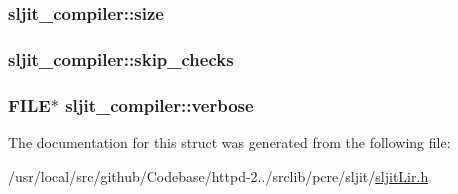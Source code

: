 \subsubsection[{\texorpdfstring{size}{size}}]{ sljit\+\_\+compiler\+::size}\hypertarget{structsljit__compiler_a39302de2338f12c65ad971f7c904c006}{}\label{structsljit__compiler_a39302de2338f12c65ad971f7c904c006}
\subsubsection[{\texorpdfstring{skip\+\_\+checks}{skip_checks}}]{ sljit\+\_\+compiler\+::skip\+\_\+checks}\hypertarget{structsljit__compiler_a3ffe514715475d66cb15f137c254ffc1}{}\label{structsljit__compiler_a3ffe514715475d66cb15f137c254ffc1}
\subsubsection[{\texorpdfstring{verbose}{verbose}}]{\setlength{\rightskip}{0pt plus 5cm}F\+I\+LE$\ast$ sljit\+\_\+compiler\+::verbose}\hypertarget{structsljit__compiler_aae189aee4170ce1cbb04b248832037d2}{}\label{structsljit__compiler_aae189aee4170ce1cbb04b248832037d2}


The documentation for this struct was generated from the following file\+:\begin{DoxyCompactItemize}
\item 
/usr/local/src/github/\+Codebase/httpd-\/2../srclib/pcre/sljit/\hyperlink{sljitLir_8h}{sljit\+Lir.\+h}\end{DoxyCompactItemize}
